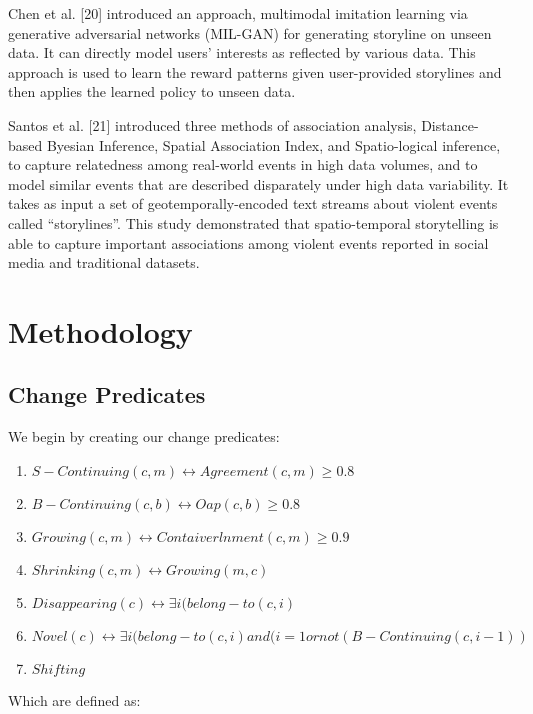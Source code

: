 \documentclass[conference]{IEEEtran}
\begin{document}
Chen et al. [20] introduced an approach, multimodal imitation learning via generative adversarial networks (MIL-GAN) for generating storyline on unseen data. It can directly model users’ interests as reflected by various data. This approach is used to learn the reward patterns given user-provided storylines and then applies the learned policy to unseen data.   




Santos et al. [21] introduced three methods of association analysis, Distance-based Byesian Inference, Spatial Association Index, and Spatio-logical inference, to capture relatedness among real-world events in high data volumes, and to model similar events that are described disparately under high data variability. It takes as input a set of geotemporally-encoded text streams about violent events called “storylines”. This study demonstrated that spatio-temporal storytelling is able to capture important associations among violent events reported in social media and traditional datasets. 


\section{Methodology}


\subsection{Change Predicates}

We begin by creating our change predicates:

\begin{enumerate}
	\item $S-Continuing (c,m)  \leftrightarrow  Agreement (c,m) \geq 0.8$
	\item $B-Continuing(c,b)  \leftrightarrow  Oap (c,b) \geq 0.8$
	\item $Growing(c,m)  \leftrightarrow  Contaiverlnment (c,m) \geq 0.9 $
	\item $Shrinking(c,m) \leftrightarrow Growing (m,c)$
	\item $Disappearing(c) \leftrightarrow \exists i (belong-to(c,i) $
	\item $Novel (c) \leftrightarrow  \exists i (belong-to(c,i) and (i=1 or not(B-Continuing(c,i-1)) $
	\item $Shifting$

\end{enumerate}

Which are defined as:
\end{document}
